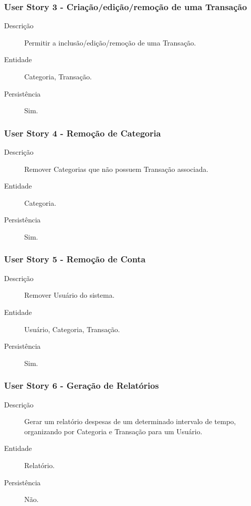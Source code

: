 \documentclass[12pt]{article}
\begin{document}
\subsubsection{User Story 3 - Criação/edição/remoção de uma Transação}

\begin{description}
 \item [Descrição] Permitir a inclusão/edição/remoção de uma Transação.
 \item [Entidade] Categoria, Transação.
 \item [Persistência] Sim.
\end{description}

\subsubsection{User Story 4 - Remoção de Categoria}

\begin{description}
 \item [Descrição] Remover Categorias que não possuem Transação associada.
 \item [Entidade] Categoria.
 \item [Persistência] Sim.
\end{description}

\subsubsection{User Story 5 - Remoção de Conta}

\begin{description}
 \item [Descrição] Remover Usuário do sistema.
 \item [Entidade] Usuário, Categoria, Transação.
 \item [Persistência] Sim.
\end{description}

\subsubsection{User Story 6 - Geração de Relatórios}

\begin{description}
 \item [Descrição] Gerar um relatório despesas de um determinado intervalo de tempo, organizando por Categoria e Transação para um Usuário.
 \item [Entidade] Relatório.
 \item [Persistência] Não.
\end{description}
\end{document}
